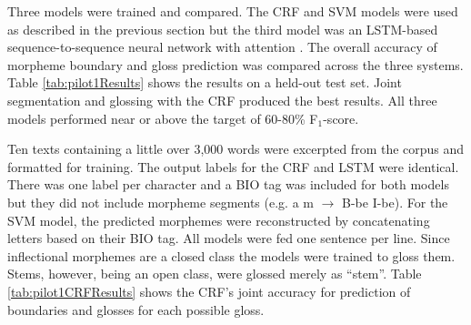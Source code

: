 Three models were trained and compared. The CRF and SVM models were used as described in the previous section but the third model was an LSTM-based sequence-to-sequence neural network \cite{sutskever2014} with attention \cite{bahdanau2014}. 
The overall accuracy of morpheme boundary and gloss prediction was compared across the three systems. Table \ref{tab:pilot1Results} shows the results on a held-out test set. Joint segmentation and glossing with the CRF produced the best results. All three models performed near or above the target of 60-80\% F$_1$-score.

Ten texts containing a little over 3,000 words were excerpted from the corpus and formatted for training. The output labels for the CRF and LSTM were identical. There was one label per character and a BIO tag was included for both models but they did not include morpheme segments (e.g. a m $\longrightarrow$ B-be I-be). For the SVM model, the predicted morphemes were reconstructed by concatenating letters based on their BIO tag. All models were fed one sentence per line. Since inflectional morphemes are a closed class the models were trained to gloss them. Stems, however, being an open class, were glossed merely as ``stem''. Table \ref{tab:pilot1CRFResults} shows the CRF's joint accuracy for prediction of boundaries and glosses for each possible gloss. 

